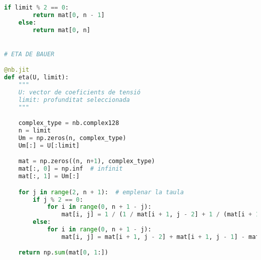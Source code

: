 \begin{lstlisting}[language=Python,numbers=none]
    if limit % 2 == 0:
        return mat[0, n - 1]
    else:
        return mat[0, n]


# ETA DE BAUER

@nb.jit
def eta(U, limit):
    """
    U: vector de coeficients de tensió
    limit: profunditat seleccionada
    """

    complex_type = nb.complex128
    n = limit
    Um = np.zeros(n, complex_type)
    Um[:] = U[:limit]

    mat = np.zeros((n, n+1), complex_type)
    mat[:, 0] = np.inf  # infinit
    mat[:, 1] = Um[:]

    for j in range(2, n + 1):  # emplenar la taula
        if j % 2 == 0:
            for i in range(0, n + 1 - j):
                mat[i, j] = 1 / (1 / mat[i + 1, j - 2] + 1 / (mat[i + 1, j - 1]) - 1 / (mat[i, j - 1]))
        else:
            for i in range(0, n + 1 - j):
                mat[i, j] = mat[i + 1, j - 2] + mat[i + 1, j - 1] - mat[i, j - 1]

    return np.sum(mat[0, 1:])
        
\end{lstlisting}

